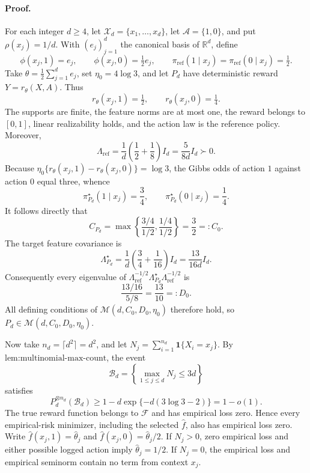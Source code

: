 \paragraph{Proof.} For each integer \(d\ge 4\), let \(\mathcal X_d=\{x_1,\ldots,x_d\}\), let \(\mathcal A=\{1,0\}\), and put \(\rho(x_j)=1/d\).  With \((e_j)_{j=1}^d\) the canonical basis of \(\mathbb R^d\), define
\[
\phi(x_j,1)=e_j,\qquad \phi(x_j,0)=\tfrac12e_j,
\qquad
\pi_{\mathrm{ref}}(1\mid x_j)=\pi_{\mathrm{ref}}(0\mid x_j)=\tfrac12.
\]
Take \(\theta=\tfrac12\sum_{j=1}^d e_j\), set \(\eta_0=4\log 3\), and let \(P_d\) have deterministic reward \(Y=r_\theta(X,A)\).  Thus
\[
r_\theta(x_j,1)=\tfrac12,\qquad r_\theta(x_j,0)=\tfrac14.
\]
The supports are finite, the feature norms are at most one, the reward belongs to \([0,1]\), linear realizability holds, and the action law is the reference policy.  Moreover,
\[
\Lambda_{\mathrm{ref}}
 =\frac1d\left(\frac12+\frac18\right)I_d
 =\frac{5}{8d}I_d\succ0.
\]
Because \(\eta_0\{r_\theta(x_j,1)-r_\theta(x_j,0)\}=\log 3\), the Gibbs odds of action \(1\) against action \(0\) equal three, whence
\[
\pi_{P_d}^\star(1\mid x_j)=\frac34,
\qquad
\pi_{P_d}^\star(0\mid x_j)=\frac14.
\]
It follows directly that
\[
C_{P_d}=\max\left\{\frac{3/4}{1/2},\frac{1/4}{1/2}\right\}=\frac32=:C_0.
\]
The target feature covariance is
\[
\Lambda_{P_d}^\star
 =\frac1d\left(\frac34+\frac1{16}\right)I_d
 =\frac{13}{16d}I_d.
\]
Consequently every eigenvalue of \(\Lambda_{\mathrm{ref}}^{-1/2}\Lambda_{P_d}^\star\Lambda_{\mathrm{ref}}^{-1/2}\) is
\[
\frac{13/16}{5/8}=\frac{13}{10}=:D_0.
\]
All defining conditions of \(\mathcal M(d,C_0,D_0,\eta_0)\) therefore hold, so \(P_d\in\mathcal M(d,C_0,D_0,\eta_0)\).

Now take \(n_d=\lceil d^2\rceil=d^2\), and let \(N_j=\sum_{i=1}^{n_d}\mathbf 1\{X_i=x_j\}\).  By \(\text{lem:multinomial-max-count}\), the event
\[
\mathcal B_d=\left\{\max_{1\le j\le d}N_j\le 3d\right\}
\]
satisfies
\[
P_d^{\otimes n_d}(\mathcal B_d)
\ge 1-d\exp\{-d(3\log3-2)\}=1-o(1).
\]
The true reward function belongs to \(\mathcal F\) and has empirical loss zero.  Hence every empirical-risk minimizer, including the selected \(\widehat f\), also has empirical loss zero.  Write \(\widehat f(x_j,1)=\widehat\theta_j\) and \(\widehat f(x_j,0)=\widehat\theta_j/2\).  If \(N_j>0\), zero empirical loss and either possible logged action imply \(\widehat\theta_j=1/2\).  If \(N_j=0\), the empirical loss and empirical seminorm contain no term from context \(x_j\).

